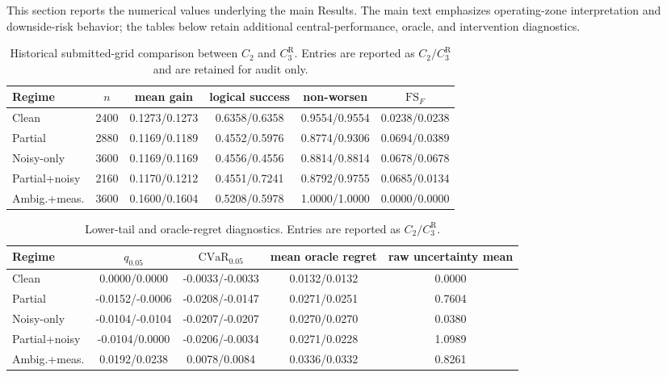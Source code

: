 \documentclass[11pt]{article}
\numberwithin{equation}{section}
\begin{document}
This section reports the numerical values underlying the main Results. The main
text emphasizes operating-zone interpretation and downside-risk behavior; the
tables below retain additional central-performance, oracle, and intervention
diagnostics.

\begin{table}[ht]
\centering
\scriptsize
\caption{Historical submitted-grid comparison between $C_2$ and $C_3^{\mathrm R}$.
Entries are reported as $C_2/C_3^{\mathrm R}$ and are retained for audit only.}
\label{tab:supp-full-regime}
\begin{tabular}{@{}lccccc@{}}
\toprule
Regime & $n$ & mean gain & logical success & non-worsen &
$\mathrm{FS}_F$ \\
\midrule
Clean & 2400 & 0.1273/0.1273 & 0.6358/0.6358 & 0.9554/0.9554 &
0.0238/0.0238 \\
Partial & 2880 & 0.1169/0.1189 & 0.4552/0.5976 & 0.8774/0.9306 &
0.0694/0.0389 \\
Noisy-only & 3600 & 0.1169/0.1169 & 0.4556/0.4556 & 0.8814/0.8814 &
0.0678/0.0678 \\
Partial+noisy & 2160 & 0.1170/0.1212 & 0.4551/0.7241 & 0.8792/0.9755 &
0.0685/0.0134 \\
Ambig.+meas. & 3600 & 0.1600/0.1604 & 0.5208/0.5978 & 1.0000/1.0000 &
0.0000/0.0000 \\
\bottomrule
\end{tabular}
\end{table}

\begin{table}[ht]
\centering
\scriptsize
\caption{Lower-tail and oracle-regret diagnostics. Entries are reported as
$C_2/C_3^{\mathrm R}$.}
\label{tab:supp-lowertail-oracle}
\begin{tabular}{@{}lcccc@{}}
\toprule
Regime & $q_{0.05}$ & $\mathrm{CVaR}_{0.05}$ & mean oracle regret &
raw uncertainty mean \\
\midrule
Clean & 0.0000/0.0000 & -0.0033/-0.0033 & 0.0132/0.0132 & 0.0000 \\
Partial & -0.0152/-0.0006 & -0.0208/-0.0147 & 0.0271/0.0251 & 0.7604 \\
Noisy-only & -0.0104/-0.0104 & -0.0207/-0.0207 & 0.0270/0.0270 & 0.0380 \\
Partial+noisy & -0.0104/0.0000 & -0.0206/-0.0034 & 0.0271/0.0228 & 1.0989 \\
Ambig.+meas. & 0.0192/0.0238 & 0.0078/0.0084 & 0.0336/0.0332 & 0.8261 \\
\bottomrule
\end{tabular}
\end{table}
\end{document}
